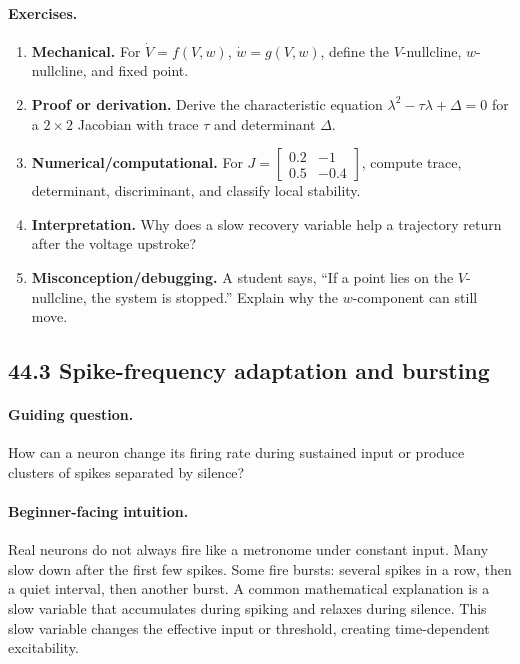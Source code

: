 \paragraph{Exercises.}
\begin{enumerate}[label=\textbf{44.2.\arabic*.}, leftmargin=*]
\item \textbf{Mechanical.} For \(\dot V=f(V,w)\), \(\dot w=g(V,w)\), define the \(V\)-nullcline, \(w\)-nullcline, and fixed point.
\item \textbf{Proof or derivation.} Derive the characteristic equation \(\lambda^2-\tau\lambda+\Delta=0\) for a \(2\times2\) Jacobian with trace \(\tau\) and determinant \(\Delta\).
\item \textbf{Numerical/computational.} For \(J=\begin{bmatrix}0.2&-1\\0.5&-0.4\end{bmatrix}\), compute trace, determinant, discriminant, and classify local stability.
\item \textbf{Interpretation.} Why does a slow recovery variable help a trajectory return after the voltage upstroke?
\item \textbf{Misconception/debugging.} A student says, ``If a point lies on the \(V\)-nullcline, the system is stopped.'' Explain why the \(w\)-component can still move.
\end{enumerate}

\subsection{44.3 Spike-frequency adaptation and bursting}

\paragraph{Guiding question.}
How can a neuron change its firing rate during sustained input or produce clusters of spikes separated by silence?

\paragraph{Beginner-facing intuition.}
Real neurons do not always fire like a metronome under constant input. Many slow down after the first few spikes. Some fire bursts: several spikes in a row, then a quiet interval, then another burst. A common mathematical explanation is a slow variable that accumulates during spiking and relaxes during silence. This slow variable changes the effective input or threshold, creating time-dependent excitability.

